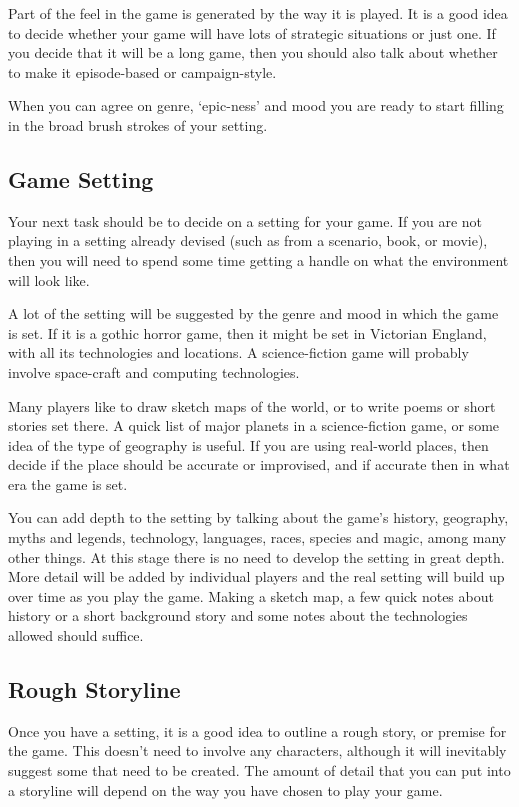 \documentclass[twoside]{book}
\begin{document}
Part of the feel in the game is generated by the way it is played. It
is a good idea to decide whether your game will have lots of strategic
situations or just one. If you decide that it will be a long game,
then you should also talk about whether to make it episode-based or
campaign-style.

When you can agree on genre, `epic-ness' and mood you are ready to
start filling in the broad brush strokes of your setting.

\subsection{Game Setting}

Your next task should be to decide on a setting for your game. If you
are not playing in a setting already devised (such as from a scenario,
book, or movie), then you will need to spend some time getting a
handle on what the environment will look like.

A lot of the setting will be suggested by the genre and mood in which
the game is set. If it is a gothic horror game, then it might be set
in Victorian England, with all its technologies and locations. A
science-fiction game will probably involve space-craft and computing
technologies.

Many players like to draw sketch maps of the world, or to write poems
or short stories set there. A quick list of major planets in a
science-fiction game, or some idea of the type of geography is
useful. If you are using real-world places, then decide if the place
should be accurate or improvised, and if accurate then in what era the
game is set.

You can add depth to the setting by talking about the game's history,
geography, myths and legends, technology, languages, races, species
and magic, among many other things. At this stage there is no need to
develop the setting in great depth. More detail will be added by
individual players and the real setting will build up over time as you
play the game. Making a sketch map, a few quick notes about history or
a short background story and some notes about the technologies allowed
should suffice.

\subsection{Rough Storyline}

Once you have a setting, it is a good idea to outline a rough story,
or premise for the game. This doesn't need to involve any characters,
although it will inevitably suggest some that need to be created. The
amount of detail that you can put into a storyline will depend on the
way you have chosen to play your game.
\end{document}
